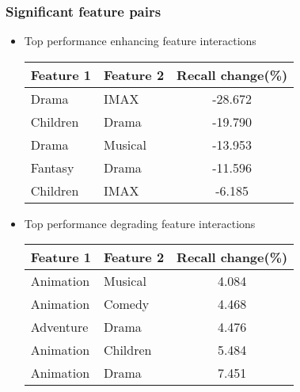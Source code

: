 \documentclass[t,xcolor={dvipsnames,usenames}]{beamer}
\begin{document}
\begin{frame}
  \frametitle{Significant feature pairs}
  \begin{itemize}
    \item Top performance enhancing feature interactions
      \begin{table}[t]\footnotesize
        \begin{threeparttable}
          \begin{tabular}{|p{2cm}|p{2cm}|c|}
            \hline
             \textbf{Feature 1} &
             \textbf{Feature 2} & 
             \textbf{Recall change(\%)} \\
            \hline
            Drama & IMAX & -28.672 \\
            \hline
            Children & Drama & -19.790 \\
            \hline
            Drama & Musical & -13.953 \\
            \hline
            Fantasy & Drama & -11.596 \\
            \hline
            Children & IMAX & -6.185  \\
            \hline
          \end{tabular}
        \end{threeparttable}
      \end{table}
 
  \item Top performance degrading feature interactions
    \begin{table}[t]\footnotesize
        \begin{threeparttable}
        \begin{tabular}{|p{2cm}|p{2cm}|c|}
          \hline
           \textbf{Feature 1} &
           \textbf{Feature 2} & 
           \textbf{Recall change(\%)} \\
          \hline
          Animation & Musical & 4.084  \\
          \hline
          Animation & Comedy & 4.468 \\
          \hline
          Adventure & Drama & 4.476 \\
          \hline
          Animation & Children & 5.484 \\
          \hline
          Animation & Drama & 7.451 \\
          \hline
        \end{tabular}
      \end{threeparttable}
    \end{table}
  \end{itemize}

\end{frame}
\end{document}
